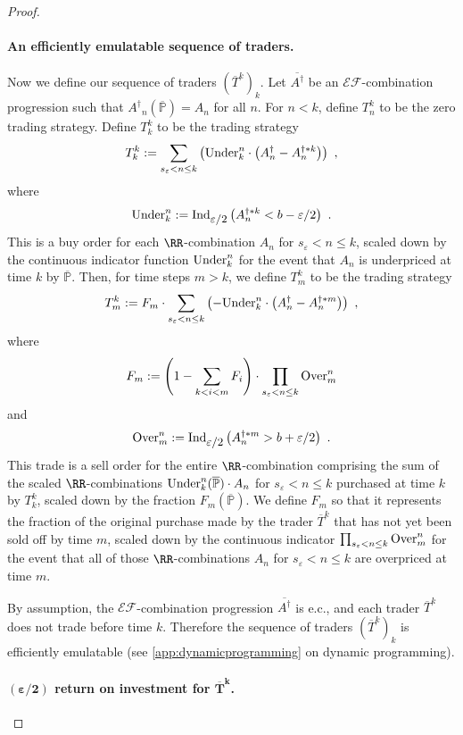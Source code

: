 \documentclass[authordate,onecolumn,noenvironments]{miri-tech-article}
\numberwithin{equation}{subsection}
\newcommand{\seq}[1]{{\overline{#1}}}
\newcommand{\ec}[1][\ ]{e.c.#1}
\newcommand{\exfeatures}{\mathcal{E\!F}} %
\newcommand{\aff}{A}
\newcommand{\trade}{T}%
\newcommand{\Trader}{\seq{\trade}} %
\newcommand{\gens}{\dagger}
\newcommand{\gen}[1]{{#1^\gens}}
\newcommand{\BelState}{\mathbb{P}}
\newcommand{\pt}{\BelState}
\newcommand{\MP}{\seq{\pt}}
\newcommand{\ftn}{(\MP)} %
\newcommand{\underpriced}{{\rm Under}}
\newcommand{\overpriced}{{\rm Over}}
\newcommand{\localportfoliovalue}{b}
\newcommand{\ctsind}[1]{\operatorname{Ind}_{\text{\small{${#1}$}}}} %
\begin{document}
\begin{proof}
\paragraph{An efficiently emulatable  sequence of traders.}

Now we define our sequence of traders $(\Trader^k)_k$. 
Let $\seq{\gen\aff}$ be an $\exfeatures$-combination progression such that $\gen\aff_n(\MP) = \aff_n$ for all $n$.
For $n < k$, define $\trade^k_n$ to be the
zero trading strategy. 
Define $\trade^k_k$ to be the trading strategy
%
\[ \trade^k_k := 
\sum_{s_\varepsilon < n\le k} \left( \underpriced_k^n \cdot \left( \aff^\gens_n - \aff_{n}^{\gens * k} \right)   \right)  \  ,
\]
where
\[ \underpriced_k^n:= \ctsind{\varepsilon/2}\left( \aff_{n}^{\gens * k} < \localportfoliovalue - \varepsilon/2
\right)\ . \]
%
This is a buy order for each $\RR$-combination $\aff_{n}$ for $s_\varepsilon <
n \le k$, scaled down by the continuous indicator function $\underpriced_k^n$ for the event that $\aff_n$ is underpriced at time $k$ by $\MP$.
Then, for time steps $m>k$, we define $\trade^k_m$ to be the trading strategy 
%
\[ \trade^k_m := F_m    \cdot 
\sum_{s_\varepsilon < n\le k} 
  \left( -\underpriced_k^n \cdot \left( \aff^\gens_n - \aff_{n}^{\gens* m} \right)\right)  \  ,
\]
where 
\[ F_m := 
\left( 1- \sum_{k<i<m} F_i \right)  \cdot
\prod_{s_\varepsilon < n\le k} 
  \overpriced_m^n
\]
and
\[ \overpriced_m^n:= \ctsind{\varepsilon/2}\left( \aff_{n}^{\gens* m} > \localportfoliovalue + \varepsilon/2 \right) \ . \]
%
This trade is a sell order for the entire $\RR$-combination comprising the sum of the scaled $\RR$-combinations
$\underpriced_k^n \ftn \cdot \aff_{n}$ for $s_\varepsilon < n \leq k$ purchased at time $k$ by $\trade^k_k$, scaled down by 
the fraction $F_m \ftn$.  We define 
$F_m$ so that it  represents the 
fraction of the original purchase made by the  trader $\Trader^k$ that has not yet been sold off by time $m$, scaled down by the  continuous indicator 
$ \prod_{s_\varepsilon < n\le k} 
  \overpriced_m^n$ for the event that
all of those $\RR$-combinations $\aff_{n}$ for $s_\varepsilon < n \leq k$ are overpriced at time $m$.

By assumption, the $\exfeatures$-combination progression $\seq{\aff^\gens}$ is 
\ec[,] and  each trader $\Trader^k$ does not trade before time $k$. 
Therefore the sequence of traders $(\Trader^k)_k$ is efficiently emulatable (see \ref{app:dynamicprogramming} on dynamic programming). 



\paragraph{$\bm{(\varepsilon/2)}$ return on investment for $\bm{\Trader^k}$.}


\end{proof}
\end{document}
